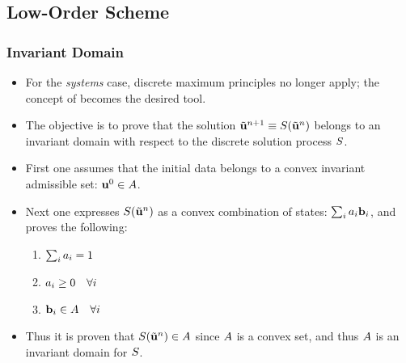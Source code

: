 \subsection{Low-Order Scheme}
\begin{frame}
\frametitle{Invariant Domain}

\begin{itemize}
  \item For the \emph{systems} case, discrete maximum principles no longer apply;
    the concept of  becomes the desired tool.
  \item The objective is to prove that the solution
    $\tilde{\mathbf{u}}^{n+1}\equiv S
      (\tilde{\mathbf{u}}^n)$ belongs to an invariant domain with
    respect to the discrete solution process $S$.
  \item First one assumes that the initial data belongs
    to a convex invariant admissible set: $\mathbf{u}^0\in A$.
  \item Next one expresses $S(\tilde{\mathbf{u}}^n)$
    as a convex combination of states:
    $\sum_ia_i\mathbf{b}_i$, and proves the following:
    \begin{enumerate}
      \item $\sum_i a_i = 1$
      \item $a_i \geq 0 \quad \forall i$
      \item $\mathbf{b}_i \in A \quad \forall i$
    \end{enumerate}
  \item Thus it is proven that
    $S(\tilde{\mathbf{u}}^n)\in A$ since
    $A$ is a convex set, and thus $A$ is an invariant
    domain for $S$.
\end{itemize}

\end{frame}

